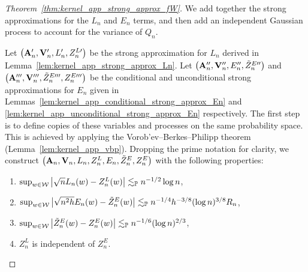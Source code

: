 \begin{proof}[Theorem~\ref{thm:kernel_app_strong_approx_fW}]

  We add together the strong approximations
  for the $L_n$ and $E_n$ terms,
  and then add an independent Gaussian process
  to account for the variance of $Q_n$.


  Let $\big(\mathbf{A}_n', \mathbf{V}_n', L_n', Z_n^{L\prime}\big)$
  be the strong approximation for $L_n$
  derived in Lemma~\ref{lem:kernel_app_strong_approx_Ln}.
  Let $\big(\mathbf{A}_n'', \mathbf{V}_n'', E_n'', \tilde Z_n^{E\prime\prime}\big)$
  and
  $\big(\mathbf{A}_n''', \mathbf{V}_n''', \tilde Z_n^{E\prime\prime\prime}, Z_n^{E\prime\prime\prime}\big)$
  be the conditional and unconditional strong approximations for $E_n$
  given in Lemmas~\ref{lem:kernel_app_conditional_strong_approx_En}
  and \ref{lem:kernel_app_unconditional_strong_approx_En}
  respectively.
  The first step is to define copies of these variables
  and processes on the same probability space.
  This is achieved by applying the
  Vorob'ev--Berkes--Philipp theorem (Lemma~\ref{lem:kernel_app_vbp}).
  Dropping the prime notation for clarity, we construct
  $\big(\mathbf{A}_n, \mathbf{V}_n, L_n, Z_n^L, E_n, \tilde Z_n^E, Z_n^E\big)$
  with the following properties:
  \begin{enumerate}[label=(\roman*)]

    \item
      $\sup_{w \in \mathcal{W}}
      \big| \sqrt{n} L_n(w) -  Z_n^L(w)\big|
      \lesssim_{\mathbb{P}} n^{-1/2} \log n$,

    \item
      $\sup_{w \in \mathcal{W}}
      \big|\sqrt{n^2h} E_n(w) - \tilde Z^E_n(w) \big|
      \lesssim_{\mathbb{P}} n^{-1/4}  h^{-3/8} (\log n)^{3/8} R_n$,

    \item
      $\sup_{w \in \mathcal{W}}
      \big| \tilde Z^E_n(w) - Z^E_n(w) \big|
      \lesssim_{\mathbb{P}} n^{-1/6} (\log n)^{2/3}$,

    \item
      $Z_n^L$ is independent of $Z_n^E$.


\end{enumerate}
\end{proof}
